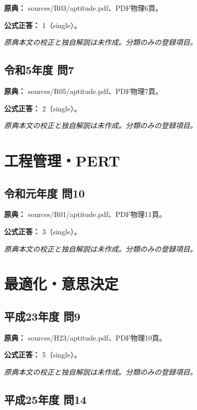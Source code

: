\noindent\textbf{原典：} sources/R03/aptitude.pdf、PDF物理6頁。

\textbf{公式正答：} 1（single）。

\par\textit{原典本文の校正と独自解説は未作成。分類のみの登録項目。}

\subsection{令和5年度 問7}
\label{q:r05-reg-apt-07}

\noindent\textbf{原典：} sources/R05/aptitude.pdf、PDF物理7頁。

\textbf{公式正答：} 2（single）。

\par\textit{原典本文の校正と独自解説は未作成。分類のみの登録項目。}

\section{工程管理・PERT}

\subsection{令和元年度 問10}
\label{q:r01-reg-apt-10}

\noindent\textbf{原典：} sources/R01/aptitude.pdf、PDF物理11頁。

\textbf{公式正答：} 3（single）。

\par\textit{原典本文の校正と独自解説は未作成。分類のみの登録項目。}

\section{最適化・意思決定}

\subsection{平成23年度 問9}
\label{q:h23-reg-apt-09}

\noindent\textbf{原典：} sources/H23/aptitude.pdf、PDF物理10頁。

\textbf{公式正答：} 5（single）。

\par\textit{原典本文の校正と独自解説は未作成。分類のみの登録項目。}

\subsection{平成25年度 問14}
\label{q:h25-reg-apt-14}

